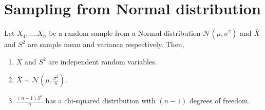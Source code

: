 \documentclass[a4paper,english,12pt]{article}
\begin{document}
\section{Sampling from Normal distribution}
\begin{thm}
Let $X_1,....X_n$ be a random sample from a Normal distribution $\mathcal{N}(\mu,\sigma^2)$ and $\overline{X}$ and $S^2$ are sample mean and variance respectively. Then,
\renewcommand{\labelenumi}{\alph{enumi})}
\begin{enumerate}
\item $\overline{X}$ and $S^2$ are independent random variables. 
\item $\overline{X} \sim \mathcal{N}(\mu,\frac{\sigma^2}{n})$.
\item $\frac{(n-1)S^2}{n}$ has a chi-squared distribution with $(n-1)$ degrees of freedom. 
\end{enumerate}
\end{thm}
\end{document}
